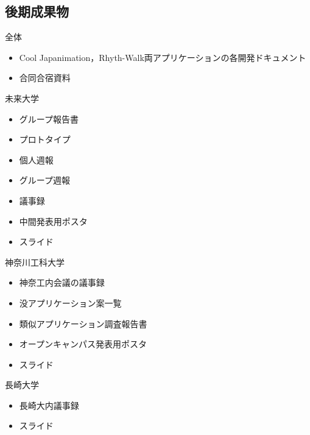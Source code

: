 \subsection{後期成果物}

全体
\begin{itemize}
\item Cool Japanimation，Rhyth-Walk両アプリケーションの各開発ドキュメント
\item 合同合宿資料　
\end{itemize}
未来大学
\begin{itemize}
\item グループ報告書
\item プロトタイプ
\item 個人週報
\item グループ週報
\item 議事録
\item 中間発表用ポスタ
\item スライド
\end{itemize}
神奈川工科大学
\begin{itemize}
\item 神奈工内会議の議事録
\item 没アプリケーション案一覧
\item 類似アプリケーション調査報告書
\item オープンキャンパス発表用ポスタ
\item スライド
\end{itemize}
長崎大学
\begin{itemize}
\item 長崎大内議事録
\item スライド
\end{itemize}
